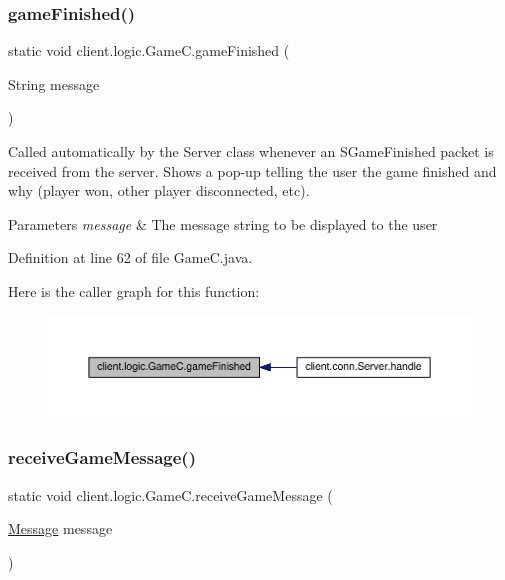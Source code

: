 \subsubsection{\texorpdfstring{game\+Finished()}{gameFinished()}}
{\footnotesize\ttfamily static void client.\+logic.\+Game\+C.\+game\+Finished (\begin{DoxyParamCaption}\item[{String}]{message }\end{DoxyParamCaption})\hspace{0.3cm}{\ttfamily [static]}}

Called automatically by the {\ttfamily Server} class whenever an {\ttfamily S\+Game\+Finished} packet is received from the server. Shows a pop-\/up telling the user the game finished and why (player won, other player disconnected, etc).


\begin{DoxyParams}{Parameters}
{\em message} & The message string to be displayed to the user \\
\hline
\end{DoxyParams}


Definition at line 62 of file Game\+C.\+java.

Here is the caller graph for this function\+:
\nopagebreak
\begin{figure}[H]
\begin{center}
\leavevmode
\includegraphics[width=350pt]{classclient_1_1logic_1_1_game_c_afee9b1e47ab82d704759506c4cb5e2ad_icgraph}
\end{center}
\end{figure}
\hypertarget{classclient_1_1logic_1_1_game_c_a70979b2783537bb175c0a8926680e236}{}\label{classclient_1_1logic_1_1_game_c_a70979b2783537bb175c0a8926680e236} 
\subsubsection{\texorpdfstring{receive\+Game\+Message()}{receiveGameMessage()}}
{\footnotesize\ttfamily static void client.\+logic.\+Game\+C.\+receive\+Game\+Message (\begin{DoxyParamCaption}\item[{\hyperlink{classpt_1_1up_1_1fe_1_1lpro1613_1_1sharedlib_1_1structs_1_1_message}{Message}}]{message }\end{DoxyParamCaption})\hspace{0.3cm}{\ttfamily [static]}}

